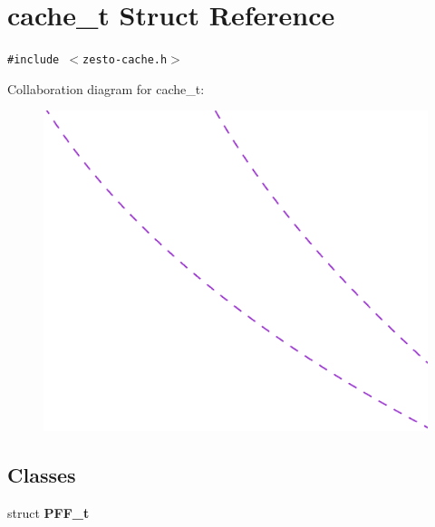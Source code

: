 \section{cache\_\-t Struct Reference}
\label{structcache__t}
{\tt \#include $<$zesto-cache.h$>$}

Collaboration diagram for cache\_\-t:\nopagebreak
\begin{figure}[H]
\begin{center}
\leavevmode
\includegraphics[width=400pt]{structcache__t__coll__graph}
\end{center}
\end{figure}
\subsection*{Classes}
\begin{CompactItemize}
\item 
struct {\bf PFF\_\-t}
\end{CompactItemize}
